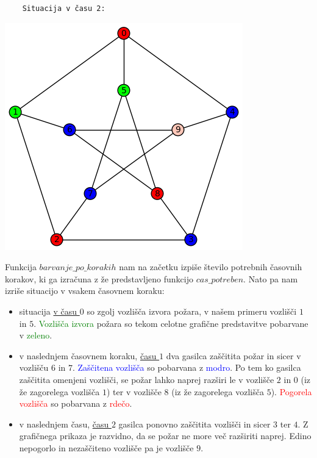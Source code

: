 \documentclass[a4paper, 12pt]{article}
\begin{document}
\begin{small}
\begin{verbatim}
    Situacija v času 2:
\end{verbatim}
\end{small}
    \begin{center}
        \includegraphics[scale=0.5]{peterson2}
    \end{center}

\noindent Funkcija $barvanje\_po\_korakih$ nam na začetku izpiše število potrebnih 
časovnih korakov, ki ga izračuna z že predstavljeno funkcijo $cas\_potreben$. 
Nato pa nam izriše situacijo v vsakem časovnem koraku:
\begin{itemize}
    \item situacija \underline{v času $0$} so
    zgolj vozlišča izvora požara, v našem primeru vozlišči $1$ in $5$. \textcolor{green}{Vozlišča izvora} 
    požara so tekom celotne grafične predstavitve pobarvane v \textcolor{green}{zeleno}. 
    \item v naslednjem časovnem koraku, \underline{času $1$} dva gasilca zaščitita požar in sicer v vozlišču $6$ in $7$.
    \textcolor{blue}{Zaščitena vozlišča} so pobarvana z \textcolor{blue}{modro}. Po tem ko gasilca zaščitita omenjeni vozlišči, se
    požar lahko naprej razširi le v vozlišče $2$ in $0$ (iz že zagorelega vozlišča $1$) ter v vozlišče $8$ (iz že
    zagorelega vozlišča $5$). \textcolor{red}{Pogorela vozlišča} so pobarvana z \textcolor{red}{rdečo}.
    \item v naslednjem času, \underline{času $2$} gasilca ponovno zaščitita vozlišči in sicer $3$ ter $4$. 
    Z grafičnega prikaza je razvidno, da se požar ne more več razširiti naprej. Edino nepogorlo
    in nezaščiteno vozlišče pa je vozlišče $9$.
\end{itemize}
\end{document}
